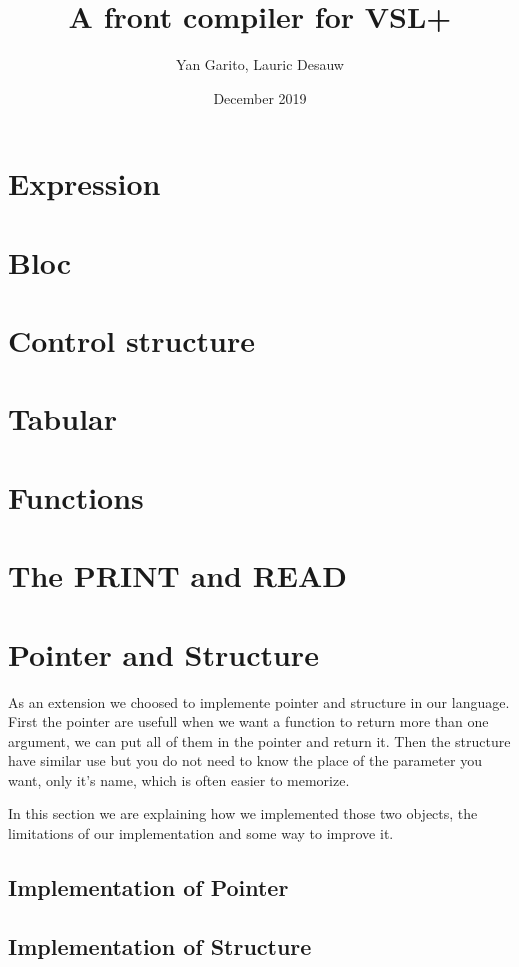 \documentclass{article}
\title{A front compiler for VSL+}
\author{Yan Garito, Lauric Desauw}
\date{December 2019}
\begin{document}
\maketitle

\section{Expression}
\section{Bloc}
\section{Control structure}
\section{Tabular}
\section{Functions}
\section{The PRINT and READ}


\section{Pointer and Structure}
As an extension we choosed to implemente pointer and structure in our language. First the pointer are usefull
when we want a function to return more than one argument, we can put all of them in the pointer and return it.
Then the structure have similar use but you do not need to know the place of the parameter you want, only it's name, which is
often easier to memorize.

In this section we are explaining how we implemented those two objects, the limitations of our implementation and
some way to improve it.

\subsection{Implementation of Pointer}
\subsection{Implementation of Structure}
\end{document}
